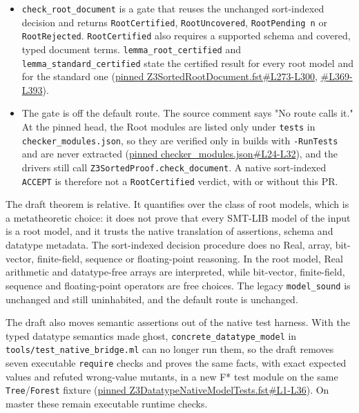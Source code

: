 \documentclass[10pt,a4paper]{article}
\begin{document}
\begin{itemize}
\item \texttt{check\_\allowbreak{}root\_\allowbreak{}document} is a gate that reuses the unchanged sort-indexed decision and returns \texttt{RootCertified}, \texttt{RootUncovered}, \texttt{RootPending n} or \texttt{RootRejected}. \texttt{RootCertified} also requires a supported schema and covered, typed document terms. \texttt{lemma\_\allowbreak{}root\_\allowbreak{}certified} and \texttt{lemma\_\allowbreak{}standard\_\allowbreak{}certified} state the certified result for every root model and for the standard one (\href{https://github.com/Z3Prover/z3/blob/497dc106537fadc7633f78d9c91ac4dbfd7baf4b/fstar/Z3SortedRootDocument.fst\#L273-L300}{pinned Z3SortedRootDocument.fst\#L273-L300}, \href{https://github.com/Z3Prover/z3/blob/497dc106537fadc7633f78d9c91ac4dbfd7baf4b/fstar/Z3SortedRootDocument.fst\#L369-L393}{\#\allowbreak{}L369-L393}).

\item The gate is off the default route. The source comment says "No route calls it." At the pinned head, the Root modules are listed only under \texttt{tests} in \texttt{checker\_\allowbreak{}modules.\allowbreak{}json}, so they are verified only in builds with \texttt{-{}\allowbreak{}RunTests} and are never extracted (\href{https://github.com/Z3Prover/z3/blob/497dc106537fadc7633f78d9c91ac4dbfd7baf4b/fstar/tools/checker_modules.json\#L24-L32}{pinned checker\_modules.json\#L24-L32}), and the drivers still call \texttt{Z3SortedProof.\allowbreak{}check\_\allowbreak{}document}. A native sort-indexed \texttt{ACCEPT} is therefore not a \texttt{RootCertified} verdict, with or without this PR.

\end{itemize}

The draft theorem is relative. It quantifies over the class of root models, which is a metatheoretic choice: it does not prove that every SMT-LIB model of the input is a root model, and it trusts the native translation of assertions, schema and datatype metadata. The sort-indexed decision procedure does no Real, array, bit-vector, finite-field, sequence or floating-point reasoning. In the root model, Real arithmetic and datatype-free arrays are interpreted, while bit-vector, finite-field, sequence and floating-point operators are free choices. The legacy \texttt{model\_\allowbreak{}sound} is unchanged and still uninhabited, and the default route is unchanged.

The draft also moves semantic assertions out of the native test harness. With the typed datatype semantics made ghost, \texttt{concrete\_\allowbreak{}datatype\_\allowbreak{}model} in \texttt{tools/\allowbreak{}test\_\allowbreak{}native\_\allowbreak{}bridge.\allowbreak{}ml} can no longer run them, so the draft removes seven executable \texttt{require} checks and proves the same facts, with exact expected values and refuted wrong-value mutants, in a new F* test module on the same \texttt{Tree}/\texttt{Forest} fixture (\href{https://github.com/Z3Prover/z3/blob/497dc106537fadc7633f78d9c91ac4dbfd7baf4b/fstar/Z3DatatypeNativeModelTests.fst\#L1-L36}{pinned Z3DatatypeNativeModelTests.fst\#L1-L36}). On master these remain executable runtime checks.
\end{document}
